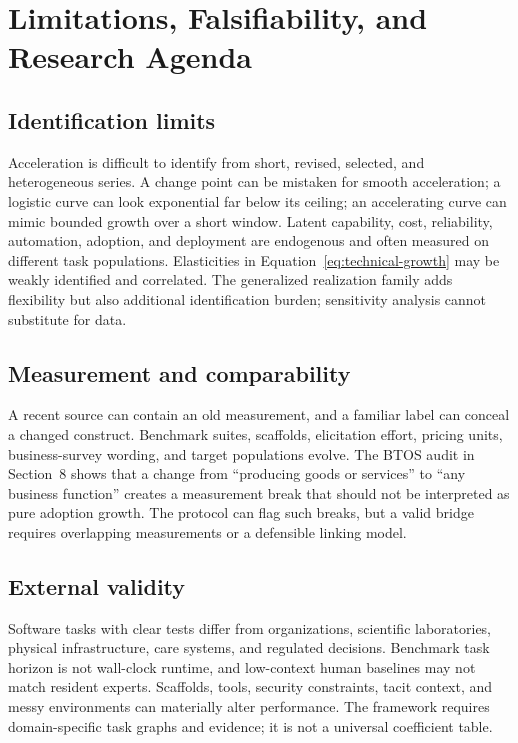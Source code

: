 \section{Limitations, Falsifiability, and Research Agenda}

\subsection{Identification limits}

Acceleration is difficult to identify from short, revised, selected, and heterogeneous series. A change point can be mistaken for smooth acceleration; a logistic curve can look exponential far below its ceiling; an accelerating curve can mimic bounded growth over a short window. Latent capability, cost, reliability, automation, adoption, and deployment are endogenous and often measured on different task populations. Elasticities in Equation~\eqref{eq:technical-growth} may be weakly identified and correlated. The generalized realization family adds flexibility but also additional identification burden; sensitivity analysis cannot substitute for data.

\subsection{Measurement and comparability}

A recent source can contain an old measurement, and a familiar label can conceal a changed construct. Benchmark suites, scaffolds, elicitation effort, pricing units, business-survey wording, and target populations evolve. The BTOS audit in Section~8 shows that a change from ``producing goods or services'' to ``any business function'' creates a measurement break that should not be interpreted as pure adoption growth. The protocol can flag such breaks, but a valid bridge requires overlapping measurements or a defensible linking model.

\subsection{External validity}

Software tasks with clear tests differ from organizations, scientific laboratories, physical infrastructure, care systems, and regulated decisions. Benchmark task horizon is not wall-clock runtime, and low-context human baselines may not match resident experts. Scaffolds, tools, security constraints, tacit context, and messy environments can materially alter performance. The framework requires domain-specific task graphs and evidence; it is not a universal coefficient table.

